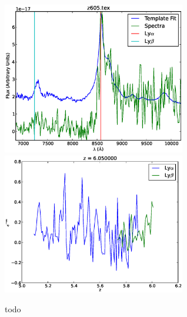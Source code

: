 \documentclass[11pt]{article}
\begin{document}
\begin{figure}[h]
  \includegraphics[width=8cm]{z605.eps}
  \includegraphics[width=8cm]{z605_Transmission.eps}
  \caption{todo}
  \label{fig:todo}
\end{figure}
\end{document}
